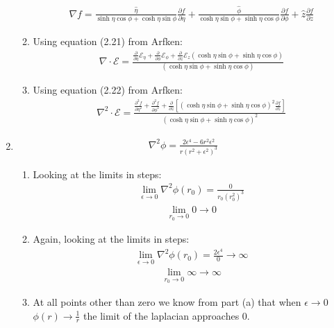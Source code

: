 \documentclass[12pt]{article}
\newcommand{\p}[2]{\frac{\partial #1}{\partial #2}}
\begin{document}
\begin{enumerate}
\begin{enumerate}
      \begin{gather*}
        \nabla f=\frac{\hat{\eta}}{\sinh\eta\cos\phi+\cosh\eta\sin\phi}\p{f}{\eta}+
        \frac{\hat{\phi}}{\cosh\eta\sin\phi+\sinh\eta\cos\phi}\p{f}{\phi}+\hat{z}\p{f}{z}
      \end{gather*}
      \item Using equation (2.21) from Arfken:
      \begin{gather*}
        \nabla\cdot\mathcal{E}=\frac{\p{}{\eta}\mathcal{E}_{\eta}+\p{}{\phi}\mathcal{E}_{\phi}+\p{}{z}\mathcal{E}_{z}(\cosh\eta\sin\phi+\sinh\eta\cos\phi)}{(\cosh\eta\sin\phi+\sinh\eta\cos\phi)}
      \end{gather*}
      \item Using equation (2.22) from Arfken:
      \begin{gather*}
        \nabla^2\cdot\mathcal{E}=\frac{\p{^2f}{\eta^2}+\p{^2f}{\phi^2}+\p{}{z}\left[(\cosh\eta\sin\phi+\sinh\eta\cos\phi)^2\p{f}{z}\right]}{(\cosh\eta\sin\phi+\sinh\eta\cos\phi)^2}
      \end{gather*}
    \end{enumerate}
    \item
    \begin{gather*}
      \nabla^2\phi=\frac{2 \epsilon ^4-6 r^2 \epsilon ^2}{r \left(r^2+\epsilon ^2\right)^3}
    \end{gather*}
    \begin{enumerate}
      \item Looking at the limits in steps:
      \begin{align*}
        \lim_{\epsilon\rightarrow0}\nabla^2\phi(r_0)=\frac{0}{r_0 \left(r_0^2\right)^3}
      \end{align*}
      \begin{align*}
        \lim_{r_0\rightarrow0}0\rightarrow0
      \end{align*}
      \item Again, looking at the limits in steps:
      \begin{align*}
        \lim_{\epsilon\rightarrow0}\nabla^2\phi(r_0)=\frac{2\epsilon^4}{0}\rightarrow\infty
      \end{align*}
      \begin{align*}
        \lim_{r_0\rightarrow0}\infty\rightarrow\infty
      \end{align*}
      \item At all points other than zero we know from part (a) that when $\epsilon\rightarrow0$ $\phi(r)\rightarrow\frac{1}{r}$ the limit of the laplacian approaches 0.

\end{enumerate}
\end{enumerate}
\end{document}
